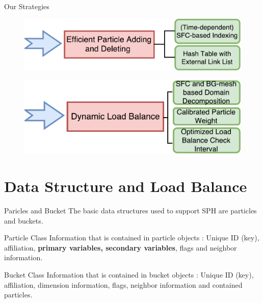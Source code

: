 \documentclass{beamer}
\begin{document}
\begin{frame}{Our Strategies}
\begin{figure}
\flushleft
\includegraphics[scale=0.5]{P_add_del}
\label{fig:P_add_del}
\end{figure}
%
\begin{figure}
\flushleft
\includegraphics[scale=0.5]{Load_balance}
\label{fig:Requirements}
\end{figure}
\end{frame}

\section{Data Structure and Load Balance}
\begin{frame}{Paricles and Bucket}
The  basic data structures used to support SPH are particles and buckets. %
\begin{block}{Particle Class}
Information that is contained in particle objects :
Unique ID (key), affiliation, {\bf primary variables, secondary variables}, flags and neighbor information.
\end{block}
\begin{block}{Bucket Class}
Information that is contained in bucket objects :
Unique ID (key), affiliation, dimension information, flags, neighbor information and contained particles.
\end{block}
\end{frame}
\end{document}

